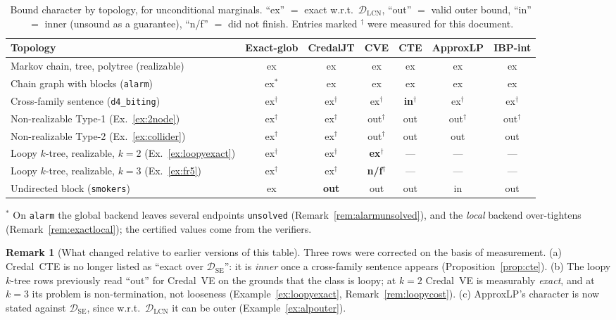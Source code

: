 \documentclass[11pt]{article}
\theoremstyle{definition}
\newtheorem{remark}{Remark}
\newcommand{\DSE}{\mathcal{D}_{\mathrm{SE}}}
\newcommand{\DLCN}{\mathcal{D}_{\mathrm{LCN}}}
\begin{document}
\begin{table}[ht]\centering\footnotesize
\caption{Bound character by topology, for unconditional marginals. ``ex'' $=$ exact w.r.t.\ $\DLCN$,
``out'' $=$ valid outer bound, ``in'' $=$ inner (unsound as a guarantee), ``n/f'' $=$ did not finish.
Entries marked $^\dagger$ were measured for this document.}\label{tab:topo}
\setlength{\tabcolsep}{4.5pt}
\begin{tabular}{@{}lcccccc@{}}
\toprule
Topology & Exact-glob & CredalJT & CVE & CTE & ApproxLP & IBP-int \\
\midrule
Markov chain, tree, polytree (realizable)     & ex & ex & ex & ex & ex & ex \\
Chain graph with blocks (\texttt{alarm})      & ex$^\ast$ & ex & ex & ex & ex & ex \\
Cross-family sentence (\texttt{d4\_biting})   & ex$^\dagger$ & ex$^\dagger$ & ex$^\dagger$ & \textbf{in}$^\dagger$ & ex$^\dagger$ & ex$^\dagger$ \\
Non-realizable Type-1 (Ex.~\ref{ex:2node})    & ex$^\dagger$ & ex$^\dagger$ & out$^\dagger$ & out & out$^\dagger$ & out$^\dagger$ \\
Non-realizable Type-2 (Ex.~\ref{ex:collider}) & ex$^\dagger$ & ex$^\dagger$ & out$^\dagger$ & out & out & out \\
Loopy $k$-tree, realizable, $k{=}2$ (Ex.~\ref{ex:loopyexact}) & ex$^\dagger$ & ex$^\dagger$ & \textbf{ex}$^\dagger$ & --- & --- & --- \\
Loopy $k$-tree, realizable, $k{=}3$ (Ex.~\ref{ex:fr5})       & ex$^\dagger$ & ex$^\dagger$ & \textbf{n/f}$^\dagger$ & --- & --- & --- \\
Undirected block (\texttt{smokers})           & ex & \textbf{out} & out & out & in & out \\
\bottomrule
\end{tabular}
\end{table}

\noindent$^\ast$ On \texttt{alarm} the global backend leaves several endpoints \texttt{unsolved}
(Remark~\ref{rem:alarmunsolved}), and the \emph{local} backend over-tightens
(Remark~\ref{rem:exactlocal}); the certified values come from the verifiers.

\begin{remark}[What changed relative to earlier versions of this table]\label{rem:tablechanges}
Three rows were corrected on the basis of measurement. (a) Credal~CTE is no longer listed as ``exact
over $\DSE$'': it is \emph{inner} once a cross-family sentence appears
(Proposition~\ref{prop:cte}). (b) The loopy $k$-tree rows previously read ``out'' for Credal~VE on the
grounds that the class is loopy; at $k{=}2$ Credal~VE is measurably \emph{exact}, and at $k{=}3$ its
problem is non-termination, not looseness (Example~\ref{ex:loopyexact},
Remark~\ref{rem:loopycost}). (c) ApproxLP's character is now stated against $\DSE$, since w.r.t.\
$\DLCN$ it can be outer (Example~\ref{ex:alpouter}).
\end{remark}
\end{document}
